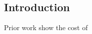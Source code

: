\subsection{Introduction}
\label{sec:introduction}

Prior work show the cost of~\cite{luccioni2022estimating}
